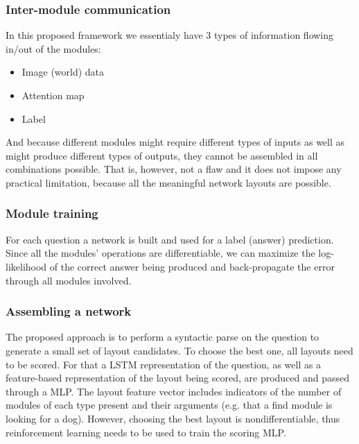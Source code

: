 \documentclass[a4paper,twocolumn]{article}
\begin{document}
\subsubsection*{Inter-module communication}
In this proposed framework we essentialy have 3 types of information flowing in/out of the modules:
    \begin{itemize}
        \item Image (world) data
        \item Attention map
        \item Label
    \end{itemize}
And because different modules might require different types of inputs as well as might produce different types of outputs, they cannot be assembled in all combinations possible. That is, however, not a flaw and it does not impose any practical limitation, because all the meaningful network layouts are possible.

\subsubsection*{Module training}
For each question a network is built and used for a label (answer) prediction.  Since all the modules' operations are differentiable, we can maximize the log-likelihood of the correct answer being produced and back-propagate the error through all modules involved.

\subsubsection*{Assembling a network}
    The proposed approach is to perform a syntactic parse on the question to generate a small set of layout candidates. To choose the best one, all layouts need to be scored. For that a LSTM representation of the question, as well as a feature-based representation of the layout being scored, are produced and passed through a MLP. The layout feature vector includes indicators of the number of modules of each type present and their arguments (e.g. that a find module is looking for a dog).
 However, choosing the best layout is nondifferentiable, thus reinforcement learning needs to be used to train the scoring MLP.
\end{document}
